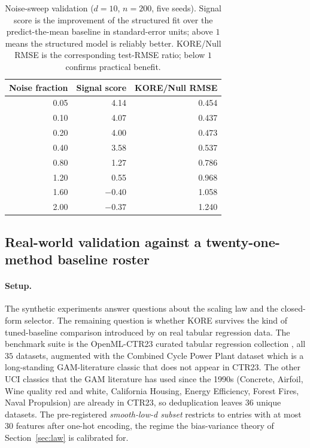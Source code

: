 \documentclass{article}
\newcommand{\KORE}{\textsc{KORE}}
\begin{document}
\begin{table}[t]
\caption{Noise-sweep validation ($d\!=\!10$, $n\!=\!200$, five seeds). Signal score is the improvement of the structured fit over the predict-the-mean baseline in standard-error units; above $1$ means the structured model is reliably better. KORE/Null RMSE is the corresponding test-RMSE ratio; below $1$ confirms practical benefit.}
\label{tab:applicability_sweep}
\centering
\small
\begin{tabular}{@{}rrr@{}}
\toprule
Noise fraction & Signal score & KORE/Null RMSE \\
\midrule
0.05 & 4.14 & 0.454 \\
0.10 & 4.07 & 0.437 \\
0.20 & 4.00 & 0.473 \\
0.40 & 3.58 & 0.537 \\
0.80 & 1.27 & 0.786 \\
1.20 & 0.55 & 0.968 \\
1.60 & $-0.40$ & 1.058 \\
2.00 & $-0.37$ & 1.240 \\
\bottomrule
\end{tabular}
\end{table}

\subsection{Real-world validation against a twenty-one-method baseline roster}
\label{sec:real_data}

\paragraph{Setup.}
The synthetic experiments answer questions about the scaling law and the closed-form selector. The remaining question is whether \KORE{} survives the kind of tuned-baseline comparison introduced by \citet{grinsztajn2022tree} on real tabular regression data. The benchmark suite is the OpenML-CTR23 curated tabular regression collection \citep{fischer2023openmlctr}, all $35$ datasets, augmented with the Combined Cycle Power Plant dataset \citep{tufekci2014} which is a long-standing GAM-literature classic that does not appear in CTR23. The other UCI classics that the GAM literature has used since the 1990s (Concrete, Airfoil, Wine quality red and white, California Housing, Energy Efficiency, Forest Fires, Naval Propulsion) are already in CTR23, so deduplication leaves $36$ unique datasets. The pre-registered \emph{smooth-low-d subset} restricts to entries with at most $30$ features after one-hot encoding, the regime the bias-variance theory of Section~\ref{sec:law} is calibrated for.
\end{document}
